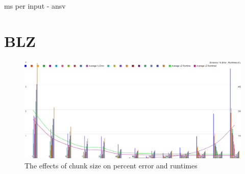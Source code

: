 ms per input - ansv

\section{BLZ}
\begin{figure}
\centering
\includegraphics[width=1.0\textwidth]{images/chart.png}
\caption{The effects of chunk size on percent error and runtimes}
\label{fig:lzchart}
\end{figure}


